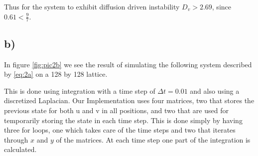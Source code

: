 Thus for the system to exhibit diffusion driven instability $D_v > 2.69$, since $0.61 < \frac{9}{7}$.


\subsection*{b)}

In figure \ref{fig:pic2b} we see the result of simulating the following system described by \eqref{eq:2a} on a 128 by 128 lattice.

This is done using integration with a time step of $\Delta t = 0.01$ and also using a discretized Laplacian. Our Implementation uses four matrices, two that stores the previous state for both u and v in all positions, and two that are used for temporarily storing the state in each time step. This is done simply by having three for loops, one which takes care of the time steps and two that iterates through $x$ and $y$ of the matrices. At each time step one part of the integration is calculated.

